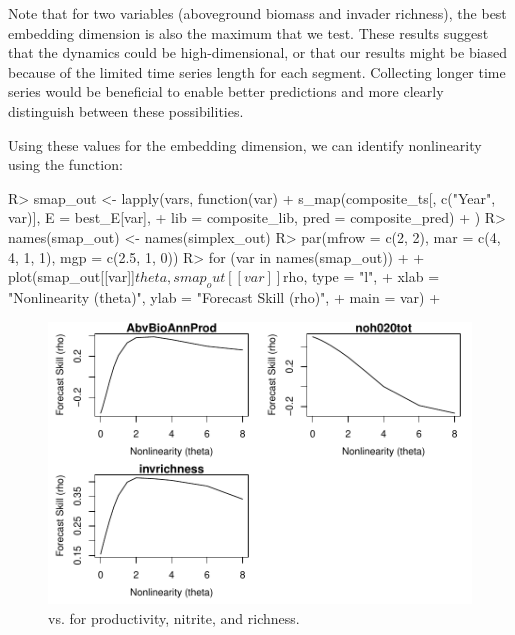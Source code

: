 \documentclass[article]{jss}
\begin{document}
Note that for two variables (aboveground biomass and invader richness), the best embedding dimension is also the maximum that we test. These results suggest that the dynamics could be high-dimensional, or that our results might be biased because of the limited time series length for each segment. Collecting longer time series would be beneficial to enable better predictions and more clearly distinguish between these possibilities.

Using these values for the embedding dimension, we can identify nonlinearity using the  function:

\begin{Schunk}
\begin{Sinput}
R> smap_out <- lapply(vars, function(var) {
+      s_map(composite_ts[, c("Year", var)], E = best_E[var], 
+            lib = composite_lib, pred = composite_pred)
+  })
R> names(smap_out) <- names(simplex_out)
R> par(mfrow = c(2, 2), mar = c(4, 4, 1, 1), mgp = c(2.5, 1, 0))
R> for (var in names(smap_out))
+  {
+      plot(smap_out[[var]]$theta, smap_out[[var]]$rho, type = "l", 
+           xlab = "Nonlinearity (theta)", ylab = "Forecast Skill (rho)", 
+           main = var)
+  }
\end{Sinput}
\end{Schunk}

\begin{figure}[t!]
\begin{center}
\includegraphics[width=6in]{article-smap-e120}
\end{center}
\caption{\label{fig:smap-e120}  vs.  for productivity, nitrite, and richness.}
\end{figure}
\end{document}
